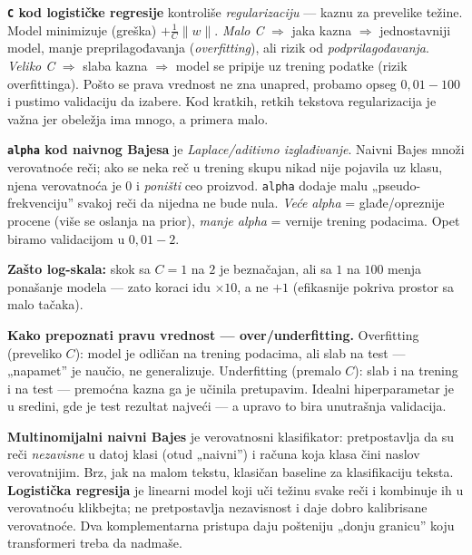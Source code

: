 \documentclass[11pt,a4paper]{article}
\newcommand{\kod}[1]{\texttt{#1}}
\begin{document}
\begin{teorija}
\textbf{\kod{C} kod logističke regresije} kontroliše \emph{regularizaciju} --- kaznu za
prevelike težine. Model minimizuje (greška) $+\frac{1}{C}\lVert w\rVert$. \emph{Malo
C} $\Rightarrow$ jaka kazna $\Rightarrow$ jednostavniji model, manje
preprilagođavanja (\emph{overfitting}), ali rizik od \emph{podprilagođavanja}. \emph{Veliko
C} $\Rightarrow$ slaba kazna $\Rightarrow$ model se pripije uz trening podatke (rizik
overfittinga). Pošto se prava vrednost ne zna unapred, probamo opseg
$0{,}01\!-\!100$ i pustimo validaciju da izabere. Kod kratkih, retkih tekstova
regularizacija je važna jer obeležja ima mnogo, a primera malo.

\medskip
\textbf{\kod{alpha} kod naivnog Bajesa} je \emph{Laplace/aditivno izglađivanje}.
Naivni Bajes množi verovatnoće reči; ako se neka reč u trening skupu nikad nije pojavila
uz klasu, njena verovatnoća je 0 i \emph{poništi} ceo proizvod. \kod{alpha} dodaje malu
„pseudo-frekvenciju'' svakoj reči da nijedna ne bude nula. \emph{Veće alpha} =
glađe/opreznije procene (više se oslanja na prior), \emph{manje alpha} = vernije
trening podacima. Opet biramo validacijom u $0{,}01\!-\!2$.

\medskip
\textbf{Zašto log-skala:} skok sa $C{=}1$ na $2$ je beznačajan, ali sa $1$ na $100$
menja ponašanje modela --- zato koraci idu $\times10$, a ne $+1$ (efikasnije pokriva
prostor sa malo tačaka).

\medskip
\textbf{Kako prepoznati pravu vrednost --- over/underfitting.} Overfitting (preveliko
$C$): model je odličan na trening podacima, ali slab na test --- „napamet'' je naučio,
ne generalizuje. Underfitting (premalo $C$): slab i na trening i na test --- premoćna
kazna ga je učinila pretupavim. Idealni hiperparametar je u sredini, gde je test
rezultat najveći --- a upravo to bira unutrašnja validacija.
\end{teorija}

\begin{teorija}
\textbf{Multinomijalni naivni Bajes} je verovatnosni klasifikator: pretpostavlja da su
reči \emph{nezavisne} u datoj klasi (otud „naivni'') i računa koja klasa čini naslov
verovatnijim. Brz, jak na malom tekstu, klasičan baseline za klasifikaciju teksta.
\textbf{Logistička regresija} je linearni model koji uči težinu svake reči i kombinuje
ih u verovatnoću klikbejta; ne pretpostavlja nezavisnost i daje dobro kalibrisane
verovatnoće. Dva komplementarna pristupa daju pošteniju „donju granicu'' koju
transformeri treba da nadmaše.
\end{teorija}
\end{document}
